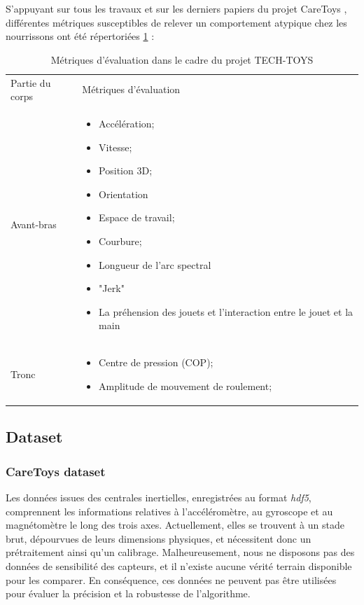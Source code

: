 \documentclass[8pt]{article}
\begin{document}
S'appuyant sur tous les travaux et sur les derniers papiers du projet CareToys \cite{rihar_infant_2019,rihar_caretoy_2016,rihar_infant_2014}, différentes métriques susceptibles de relever un comportement atypique chez les nourrissons ont été répertoriées \ref{tab:metrics} :
\begin{table}[H]
    \centering
    \begin{tabularx}{\textwidth}{|p{}|X|}
    \rowcolor{lightgray}
     Partie du corps & Métriques d'évaluation\\
     Avant-bras &  \begin{itemize}
                        \item Accélération;
                        \item Vitesse;
                        \item Position 3D;
                        \item Orientation
                        \item Espace de travail;
                        \item Courbure;
                        \item Longueur de l'arc spectral
                        \item "Jerk"
                        \item La préhension des jouets et l'interaction entre le jouet et la main
                      \end{itemize}
                     \\
\hline
    Tronc & \begin{itemize}
                        \item Centre de pression (COP);
                        \item Amplitude de mouvement de roulement;
                      \end{itemize} \\
\hline
\end{tabularx}
    \caption{Métriques d'évaluation dans le cadre du projet TECH-TOYS}
    \label{tab:metrics}
\end{table}
\subsection{Dataset}
\subsubsection{CareToys dataset}
Les données issues des centrales inertielles, enregistrées au format \textit{hdf5}, comprennent les informations relatives à l'accéléromètre, au gyroscope et au magnétomètre le long des trois axes. Actuellement, elles se trouvent à un stade brut, dépourvues de leurs dimensions physiques, et nécessitent donc un prétraitement ainsi qu'un calibrage. Malheureusement, nous ne disposons pas des données de sensibilité des capteurs, et il n'existe aucune vérité terrain disponible pour les comparer. En conséquence, ces données ne peuvent pas être utilisées pour évaluer la précision et la robustesse de l'algorithme.
\end{document}
